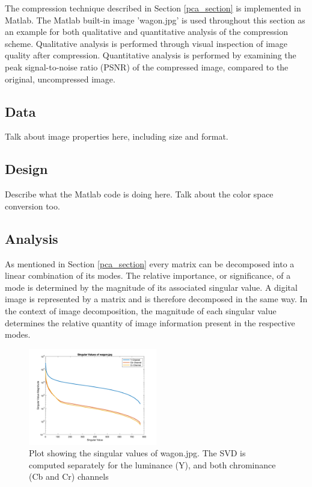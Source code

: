 \documentclass[conference]{IEEEtran}
\begin{document}
    The compression technique described in Section \ref{pca_section} is implemented in Matlab. The Matlab built-in image 'wagon.jpg' is used throughout this section as an example for both qualitative and quantitative analysis of the compression scheme. Qualitative analysis is performed through visual inspection of image quality after compression. Quantitative analysis is performed by examining the peak signal-to-noise ratio (PSNR) of the compressed image, compared to the original, uncompressed image.

    \subsection{Data}
    Talk about image properties here, including size and format.

    \subsection{Design}
    Describe what the Matlab code is doing here. Talk about the color space conversion too.

    \subsection{Analysis}
    As mentioned in Section \ref{pca_section} every matrix can be decomposed into a linear combination of its modes. The relative importance, or significance, of a mode is determined by the magnitude of its associated singular value. A digital image is represented by a matrix and is therefore decomposed in the same way. In the context of image decomposition, the magnitude of each singular value determines the relative quantity of image information present in the respective modes.

    \begin{figure}[t]
    \includegraphics[width=0.5\textwidth]{svals_wagon}
    \caption{Plot showing the singular values of wagon.jpg. The SVD is computed separately for the luminance (Y), and both chrominance (Cb and Cr) channels}
    \label{fig:svalplot}
    \end{figure}
    
\end{document}
